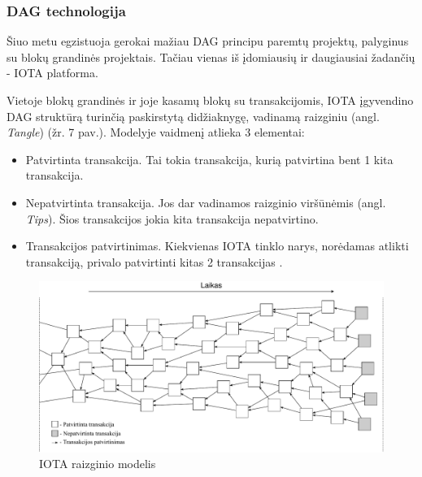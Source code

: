 \subsubsection{DAG technologija}

Šiuo metu egzistuoja gerokai mažiau DAG principu paremtų projektų, palyginus su blokų grandinės projektais. Tačiau vienas iš įdomiausių ir daugiausiai žadančių - IOTA platforma. 





Vietoje blokų grandinės ir joje kasamų blokų su transakcijomis, IOTA įgyvendino DAG struktūrą turinčią paskirstytą didžiaknygę, vadinamą raizginiu (angl. \textit{Tangle}) (žr. 7 pav.). Modelyje vaidmenį atlieka 3 elementai:
\begin{itemize}
    \item Patvirtinta transakcija. Tai tokia transakcija, kurią patvirtina bent 1 kita transakcija.
    \item Nepatvirtinta transakcija. Jos dar vadinamos raizginio viršūnėmis (angl. \textit{Tips}). Šios transakcijos jokia kita transakcija nepatvirtino.
    \item Transakcijos patvirtinimas. Kiekvienas IOTA tinklo narys, norėdamas atlikti transakciją, privalo patvirtinti kitas 2 transakcijas \cite{popov2016tangle}.
\end{itemize} 

\begin{figure}[H]
    \centering
    \includegraphics[scale=0.56]{images/iota-tangle}
    \caption{IOTA raizginio modelis}
\end{figure}

